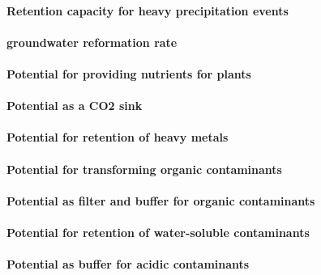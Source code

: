 \documentclass[preprint,12pt,authoryear]{elsarticle}
\begin{document}
\paragraph{Retention capacity for heavy precipitation events}
 
 
\paragraph{groundwater reformation rate}


\paragraph{Potential for providing nutrients for plants}

\paragraph{Potential as a CO2 sink}

\paragraph{Potential for retention of heavy metals}

\paragraph{Potential for transforming organic contaminants}

\paragraph{Potential as filter and buffer for organic contaminants}

\paragraph{Potential for retention of water-soluble contaminants}

\paragraph{Potential as buffer for acidic contaminants}
\end{document}
